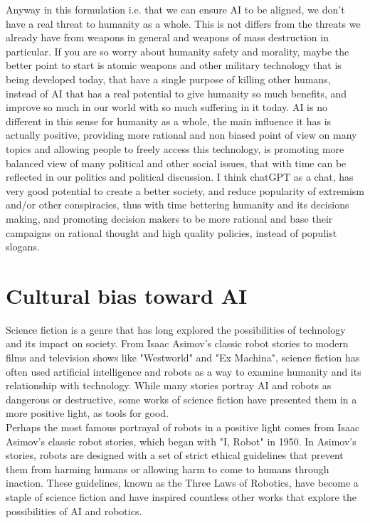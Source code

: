 \documentclass{article}
\begin{document}
Anyway in this formulation i.e. that we can ensure AI to be aligned, we don't have a real threat to humanity as a whole. This is not differs from the threats we already have from weapons in general and weapons of mass destruction in particular. If you are so worry about humanity safety and morality, maybe the better point to start is atomic weapons and other military technology that is being developed today, that have a single purpose of killing other humans, instead of AI that has a real potential to give humanity so much benefits, and improve so much in our world with so much suffering in it today. AI is no different in this sense for humanity as a whole, the main influence it has is actually positive, providing more rational and non biased point of view on many topics and allowing people to freely access this technology, is promoting more balanced view of many political and other social issues, that with time can be reflected in our politics and political discussion. I think chatGPT as a chat, has very good potential to create a better society, and reduce popularity of extremism and/or other conspiracies, thus with time bettering humanity and its decisions making, and promoting decision makers to be more rational and base their campaigns on rational thought and high quality policies, instead of populist slogans. \\

\section{Cultural bias toward AI}


Science fiction is a genre that has long explored the possibilities of technology and its impact on society. From Isaac Asimov's classic robot stories\cite{asimov1950irobot} to modern films and television shows like "Westworld"\cite{westworld} and "Ex Machina"\cite{exmachina}, science fiction has often used artificial intelligence and robots as a way to examine humanity and its relationship with technology. While many stories portray AI and robots as dangerous or destructive, some works of science fiction have presented them in a more positive light, as tools for good.\\

Perhaps the most famous portrayal of robots in a positive light comes from Isaac Asimov's classic robot stories, which began with "I, Robot" in 1950\cite{asimov1950irobot}. In Asimov's stories, robots are designed with a set of strict ethical guidelines that prevent them from harming humans or allowing harm to come to humans through inaction. These guidelines, known as the Three Laws of Robotics, have become a staple of science fiction and have inspired countless other works that explore the possibilities of AI and robotics.\\
\end{document}
